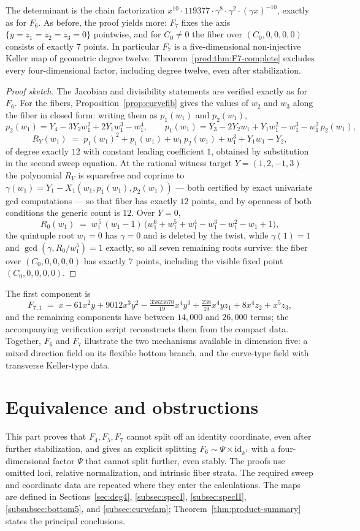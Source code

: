 \documentclass[11pt]{article}
\numberwithin{equation}{section}
\theoremstyle{plain}
\theoremstyle{definition}
\theoremstyle{remark}
\newcommand{\A}{\mathbb{A}}
\newcommand{\id}{\mathrm{id}}
\begin{document}
The determinant is the chain factorization
$x^{10}\cdot119377\cdot\gamma^{8}\cdot\gamma^{2}\cdot(\gamma x)^{-10}$, exactly
as for $F_6$. As before, the proof yields more: $F_7$ fixes the axis
$\{y=z_1=z_2=z_3=0\}$ pointwise, and for $C_0\neq0$ the fiber over
$(C_0,0,0,0,0)$ consists of exactly $7$ points. In particular $F_7$ is a
five-dimensional non-injective Keller map of geometric degree twelve.
Theorem~\ref{prod:thm:F7-complete} excludes every four-dimensional factor,
including degree twelve, even after stabilization.

\begin{proof}[Proof sketch]
The Jacobian and divisibility statements are verified exactly as for $F_6$. For the
fibers, Proposition~\ref{prop:curvefib} gives the values of $w_2$ and $w_3$
along the fiber in closed form: writing them as $p_1(w_1)$ and $p_2(w_1)$,
\[
p_2(w_1)=Y_4-3Y_2w_1^2+2Y_1w_1^3-w_1^4,\qquad
p_1(w_1)=Y_3-2Y_2w_1+Y_1w_1^2-w_1^3-w_1^2\,p_2(w_1),
\]
\[
R_Y(w_1)\;=\;p_1(w_1)^2+p_1(w_1)+w_1\,p_2(w_1)+w_1^3+Y_1w_1-Y_2 ,
\]
of degree exactly $12$ with constant leading coefficient $1$, obtained by
substitution in the second sweep equation. At the rational witness target $Y=(1,2,-1,3)$ the polynomial
$R_Y$ is squarefree and coprime to $\gamma(w_1)=Y_1-X_1(w_1,p_1(w_1),p_2(w_1))$
--- both certified by exact univariate gcd computations --- so that fiber has
exactly $12$ points, and by openness of both conditions the generic count is
$12$. Over $Y=0$,
\[
R_0(w_1)\;=\;w_1^{\,5}\,(w_1-1)\,
\bigl(w_1^6+w_1^5+w_1^4-w_1^3-w_1^2-w_1+1\bigr),
\]
the quintuple root $w_1=0$ has $\gamma=0$ and is deleted by the twist, while
$\gamma(1)=1$ and $\gcd(\gamma,R_0/w_1^5)=1$ exactly, so all seven remaining
roots survive: the fiber over $(C_0,0,0,0,0)$ has exactly $7$ points,
including the visible fixed point $(C_0,0,0,0,0)$.
\end{proof}

The first component is
\[
F_{7,1}\;=\;x-61x^2y+9012x^3y^2-\tfrac{35823670}{19}x^4y^3
+\tfrac{238}{19}x^4yz_1+8x^4z_2+x^5z_3 ,
\]
and the remaining components have between $14{,}000$ and $26{,}000$ terms;
the accompanying verification script reconstructs them from the compact data.
Together, $F_6$ and $F_7$ illustrate the two mechanisms available in dimension
five: a mixed direction field on its flexible bottom branch, and the
curve-type field with transverse Keller-type data.

\clearpage
\part{Equivalence and obstructions}\label{part:equivalence}
This part proves that $F_4,F_5,F_7$ cannot split off an identity
coordinate, even after further stabilization, and gives an explicit
splitting $F_6\sim\Psi\times\id_{\A^1}$ with a four-dimensional factor
$\Psi$ that cannot split further, even stably. The proofs use omitted
loci, relative normalization, and intrinsic fiber strata. The required
sweep and coordinate data are repeated where they enter the calculations.
The maps are defined in Sections~\ref{sec:deg4}, \ref{subsec:specI},
\ref{subsec:specII}, \ref{subsubsec:bottom5}, and \ref{subsec:curvefam};
Theorem~\ref{thm:product-summary} states the principal conclusions.
\end{document}
